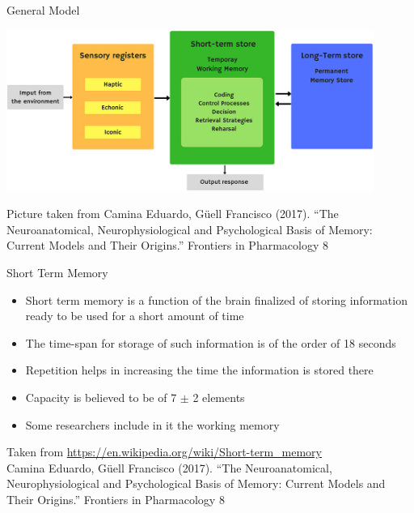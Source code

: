 \documentclass{beamer}
\begin{document}
\begin{frame}
{\centerline{General Model}}

\begin{center}

 \includegraphics[width=12cm]{P2023.AIBCCSS.KnowledgeAcquisitionRetentionUse/MemoryStructure.jpg}
 
 \end{center}


\begin{center}
    \tiny{Picture taken from 
    Camina Eduardo, G\"{u}ell Francisco (2017). ``The Neuroanatomical, Neurophysiological and Psychological Basis of Memory: Current Models and Their Origins.'' Frontiers in Pharmacology 8}
\end{center}

\end{frame}

\begin{frame}
{\centerline{Short Term Memory}}
\begin{itemize}
    \item Short term memory is a function of the brain finalized of storing information ready to be used for a short amount of time
  \item The time-span for storage of such information is of the order of 18 seconds
  \item Repetition helps in increasing the time the information is stored there
  \item Capacity is believed to be of 7 $\pm$ 2 elements
  \item Some researchers include in it the working memory
\end{itemize} 

\begin{center}
    \tiny{Taken from \url{https://en.wikipedia.org/wiki/Short-term_memory}\\
    Camina Eduardo, G\"{u}ell Francisco (2017). ``The Neuroanatomical, Neurophysiological and Psychological Basis of Memory: Current Models and Their Origins.'' Frontiers in Pharmacology 8}
\end{center}

\end{frame}
\end{document}
